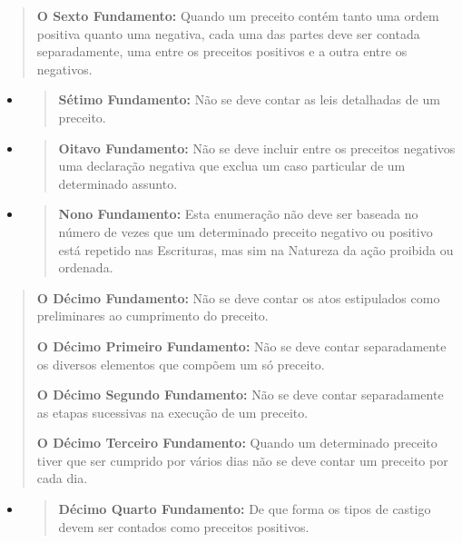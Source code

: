 \begin{quote}
\textbf{O Sexto Fundamento:} Quando um preceito contém tanto uma ordem
positiva quanto uma negativa, cada uma das partes deve ser contada
separadamente, uma entre os preceitos positivos e a outra entre os
negativos.
\end{quote}

\begin{itemize}
\item
  \begin{quote}
  \textbf{Sétimo Fundamento:} Não se deve contar as leis detalhadas de
  um preceito.
  \end{quote}
\item
  \begin{quote}
  \textbf{Oitavo Fundamento:} Não se deve incluir entre os preceitos
  negativos uma declaração negativa que exclua um caso particular de um
  determinado assunto.
  \end{quote}
\item
  \begin{quote}
  \textbf{Nono Fundamento:} Esta enumeração não deve ser baseada no
  número de vezes que um determinado preceito negativo ou positivo está
  repetido nas Es­crituras, mas sim na Natureza da ação proibida ou
  ordenada.
  \end{quote}
\end{itemize}

\begin{quote}
\textbf{O Décimo Fundamento:} Não se deve contar os atos estipulados
como prelimi­nares ao cumprimento do preceito.

\textbf{O Décimo Primeiro Fundamento:} Não se deve contar separadamente
os diver­sos elementos que compõem um só preceito.

\textbf{O Décimo Segundo Fundamento:} Não se deve contar separadamente
as etapas sucessivas na execução de um preceito.

\textbf{O Décimo Terceiro Fundamento:} Quando um determinado preceito
tiver que ser cumprido por vários dias não se deve contar um preceito
por cada dia.
\end{quote}

\begin{itemize}
\item
  \begin{quote}
  \textbf{Décimo Quarto Fundamento:} De que forma os tipos de castigo
  devem ser contados como preceitos positivos.
  \end{quote}
\end{itemize}

